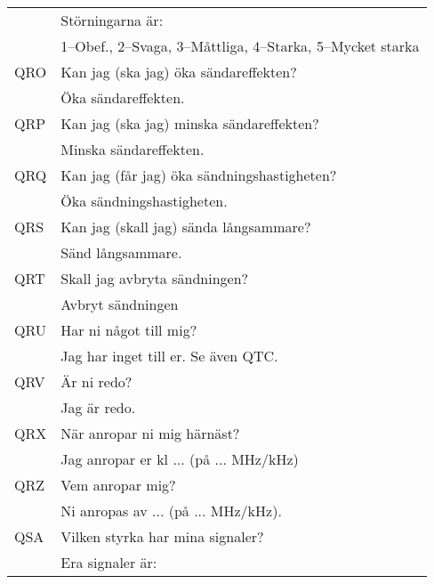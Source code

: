 \begin{longtable}{ll}
	    & Störningarna är:                                                     \\
	    & 1--Obef., 2--Svaga, 3--Måttliga, 4--Starka, 5--Mycket starka         \\ \hline
	QRO & Kan jag (ska jag) öka sändareffekten?                                \\
	    & Öka sändareffekten.                                                  \\ \hline
	QRP & Kan jag (ska jag) minska sändareffekten?                             \\
	    & Minska sändareffekten.                                               \\ \hline
	QRQ & Kan jag (får jag) öka sändningshastigheten?                          \\
	    & Öka sändningshastigheten.                                            \\ \hline
	QRS & Kan jag (skall jag) sända långsammare?                               \\
	    & Sänd långsammare.                                                    \\ \hline
	QRT & Skall jag avbryta sändningen?                                        \\
	    & Avbryt sändningen                                                    \\ \hline
	QRU & Har ni något till mig?                                               \\
	    & Jag har inget till er. Se även QTC.                                  \\ \hline
	QRV & Är ni redo?                                                          \\
	    & Jag är redo.                                                         \\ \hline
	QRX & När anropar ni mig härnäst?                                          \\
	    & Jag anropar er kl ... (på ... MHz/kHz)                               \\ \hline
	QRZ & Vem anropar mig?                                                     \\
	    & Ni anropas av ... (på ... MHz/kHz).                                  \\ \hline
	QSA & Vilken styrka har mina signaler?                                     \\
	    & Era signaler är:                                                     \\

\end{longtable}
